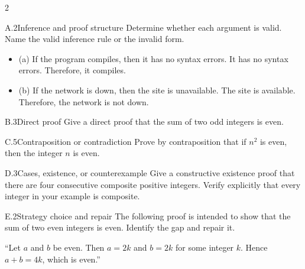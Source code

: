 \documentclass[9pt]{extarticle}
\begin{document}
\begin{multicols}{2}
\begin{CoreProblem}{A.2}{Inference and proof structure}
Determine whether each argument is valid. Name the valid inference rule or the invalid form.
\begin{itemize}
  \item (a) If the program compiles, then it has no syntax errors. It has no syntax errors. Therefore, it compiles.
  \item (b) If the network is down, then the site is unavailable. The site is
        available. Therefore, the network is not down.
\end{itemize}
\end{CoreProblem}
\begin{CoreProblem}{B.3}{Direct proof}
Give a direct proof that the sum of two odd integers is even.
\end{CoreProblem}
\begin{CoreProblem}{C.5}{Contraposition or contradiction}
Prove by contraposition that if $n^2$ is even, then the integer $n$ is even.
\end{CoreProblem}
\columnbreak
\begin{CoreProblem}{D.3}{Cases, existence, or counterexample}
Give a constructive existence proof that there are four consecutive composite
positive integers. Verify explicitly that every integer in your example is
composite.
\end{CoreProblem}
\begin{CoreProblem}{E.2}{Strategy choice and repair}
The following proof is intended to show that the sum of two even integers is even. Identify the gap and repair it.

``Let $a$ and $b$ be even. Then $a=2k$ and $b=2k$ for some integer $k$. Hence $a+b=4k$, which is even.''
\end{CoreProblem}
\end{multicols}
\CoreWorkArea
\FormBreak
{}
\end{document}
